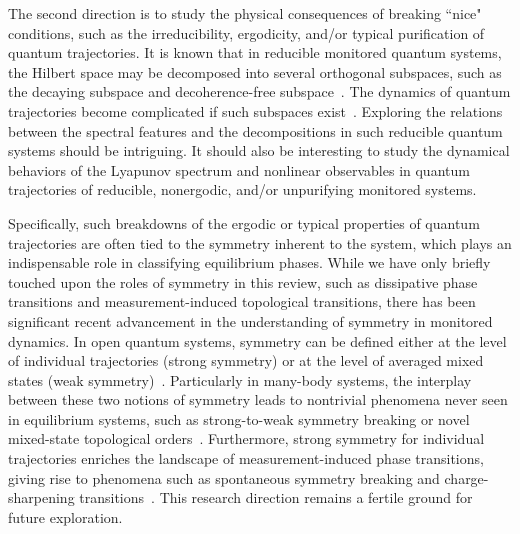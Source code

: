 \documentclass[preprint,pteplogo]{ptephy_v2}%
\numberwithin{equation}{section}
\theoremstyle{definition}
\begin{document}
The second direction is to study the physical consequences of breaking ``nice" conditions, such as the irreducibility, ergodicity, and/or typical purification of quantum trajectories. 
It is known that in reducible monitored quantum systems, the Hilbert space may be decomposed into several orthogonal subspaces, such as the decaying subspace and decoherence-free subspace~\cite{baumgartner2012structures}. 
The dynamics of quantum trajectories become complicated if such subspaces exist~\cite{benoist2024exponentially,schmolke2025asymptotic}. 
Exploring the relations between the spectral features and the decompositions in such reducible quantum systems should be intriguing. 
It should also be interesting to study the dynamical behaviors of the Lyapunov spectrum and nonlinear observables in quantum trajectories of reducible, nonergodic, and/or unpurifying monitored systems.

Specifically, such breakdowns of the ergodic or typical properties of quantum trajectories are often tied to the symmetry inherent to the system, which plays an indispensable role in classifying equilibrium phases.
While we have only briefly touched upon the roles of symmetry in this review, such as dissipative phase transitions and measurement-induced topological transitions, there has been significant recent advancement in the understanding of symmetry in monitored dynamics. 
In open quantum systems, symmetry can be defined either at the level of individual trajectories (strong symmetry) or at the level of averaged mixed states (weak symmetry)~\cite{buvca2012note, albert2014symmetries, Lieu2020symmetry}. 
Particularly in many-body systems, the interplay between these two notions of symmetry leads to nontrivial phenomena never seen in equilibrium systems, such as strong-to-weak symmetry breaking or novel mixed-state topological orders~\cite{Ma2023Average, Lee2023quantum, Ma2025strong, Wang2025intrinsic, Sohal2025noisy, Ellison2025toward}. 
Furthermore, strong symmetry for individual trajectories enriches the landscape of measurement-induced phase transitions, giving rise to phenomena such as spontaneous symmetry breaking and charge-sharpening transitions~\cite{Sang2021measurement, Bao2021symmetry, Agrawal2022entanglement, Barratt2022field, Oshima2023charge, Majidy2023critical}.
This research direction remains a fertile ground for future exploration.
\end{document}
